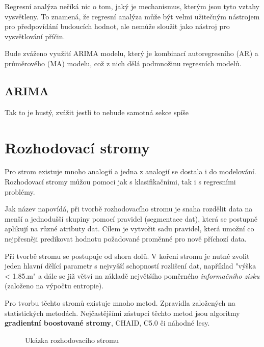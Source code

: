 \documentclass[FM,BP,fonts]{tulthesis}
\begin{document}
Regresní analýza neříká nic o tom, jaký je mechanismus, kterým jsou tyto vztahy vysvětleny. To znamená, že regresní analýza může být velmi užitečným nástrojem pro předpovídání budoucích hodnot, ale nemůže sloužit jako nástroj pro vysvětlování příčin.

Bude zváženo využití ARIMA modelu, který je kombinací autoregresního (AR) a průměrového (MA) modelu, což z nich dělá podmnožinu regresních modelů.


\subsection{ARIMA}
Tak to je hustý, zvážit jestli to nebude samotná sekce spíše



\newpage

\section{Rozhodovací stromy}
Pro strom existuje mnoho analogií a jedna z analogií se dostala i do modelování. Rozhodovací stromy můžou pomoci jak s klasifikačními, tak i s regresními problémy. 

Jak název napovídá, při tvorbě rozhodovacího stromu je snaha rozdělit data na menší a jednodušší skupiny pomocí pravidel (segmentace dat), která se postupně aplikují na různé atributy dat. Cílem je vytvořit sadu pravidel, která umožní co nejpřesněji predikovat hodnotu požadované proměnné pro nově příchozí data.

Při tvorbě stromu se postupuje od shora dolů. V kořeni stromu je nutné zvolit jeden hlavní dělící parametr s nejvyšší schopností rozlišení dat, například "výška < 1.85.m" a dále se již větví na základě největšího poměrného \textit{informačního zisku} (založeno na výpočtu entropie).  \cite{Tomsik2016thesis}

Pro tvorbu těchto stromů existuje mnoho metod. Zpravidla založených na statistických metodách. Nejčastějšími zástupci těchto metod jsou algoritmy \textbf{gradientní boostované stromy}, CHAID, C5.0 či náhodné lesy. \cite{Tomsik2016thesis}

\begin{figure}[htbp]
	\centering
	\caption{Ukázka rozhodovacího stromu}
	\label{fig:my_graph}
\end{figure}
\end{document}
